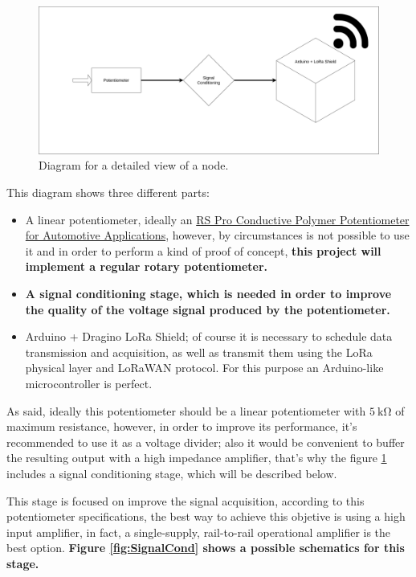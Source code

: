 \documentclass[11pt,a4paper,dvipsnames,twoside]{article}
\newcounter{subsubsubsection}[subsubsection]
\newcommand{\doubt}[1] {\textbf{\color{Red3}#1}}
\begin{document}
\begin{figure}[htp]
  \centering
  \includegraphics[width=.9\textwidth]{../schemes/node_tbg.png}
  \caption{Diagram for a detailed view of a node.}
  \label{fig:NodeDiag}
\end{figure}

This diagram shows three different parts:

\begin{itemize}
  \item A linear potentiometer, ideally an \href{https://docs.rs-online.com/37bf/0900766b814f0bd0.pdf}{RS Pro Conductive Polymer
  Potentiometer for Automotive Applications}, however, by circumstances is not possible to use it and in order to perform a kind of proof of concept, \doubt{this project will implement a regular rotary potentiometer.}
  \item \doubt{A signal conditioning stage, which is needed in order to improve the quality of the voltage signal produced by the potentiometer.}
  \item Arduino + Dragino LoRa Shield; of course it is necessary to schedule data transmission and acquisition, as well as transmit them using the LoRa physical layer and LoRaWAN protocol. For this purpose an Arduino-like microcontroller is perfect.
\end{itemize}

As said, ideally this potentiometer should be a linear potentiometer with $5\ \si{\kilo\ohm}$ of maximum resistance, however, in order to improve its performance, it's recommended to use it as a voltage divider; also it would be convenient to buffer the resulting output with a high impedance amplifier, that's why the figure \ref{fig:NodeDiag} includes a signal conditioning stage, which will be described below.

This stage is focused on improve the signal acquisition, according to this potentiometer specifications, the best way to achieve this objetive is using a high input amplifier, in fact, a single-supply, rail-to-rail operational amplifier is the best option. \doubt{Figure \ref{fig:SignalCond} shows a possible schematics for this stage.}
\end{document}
